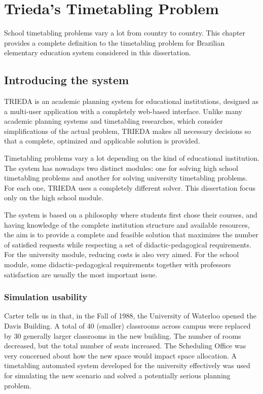 \chapter{Trieda's Timetabling Problem}
\label{chap:timetabling}


School timetabling problems vary a lot from country to country. This chapter provides a complete definition to the timetabling problem for Brazilian elementary education system considered in this dissertation.



\section{Introducing the system}
\label{sec:system}


TRIEDA is an academic planning system for educational institutions, designed as a multi-user application with a completely web-based interface. Unlike many academic planning systems and timetabling researches, which consider simplifications of the actual problem, TRIEDA makes all necessary decisions so that a complete, optimized and applicable solution is provided.

Timetabling problems vary a lot depending on the kind of educational institution. The system has nowadays two distinct modules: one for solving high school timetabling problems and another for solving university timetabling problems. For each one, TRIEDA uses a completely different solver. This dissertation focus only on the high school module.

The system is based on a  philosophy where students first chose their courses, and having knowledge of the complete institution structure and available resources, the aim is to provide a complete and feasible solution that maximizes the number of satisfied requests while respecting a set of didactic-pedagogical requirements. For the university module, reducing costs is also very aimed. For the school module, some didactic-pedagogical requirements together with professors satisfaction are usually the most important issue.


\subsection{Simulation usability}
\label{subsec:simulation}

Carter tells us in \cite{Carter2001} that, in the Fall of 1988, the University of Waterloo opened the Davis Building. A total of 40 (smaller) classrooms across campus were replaced by 30 generally larger classrooms in the new building. The number of rooms decreased, but the total number of seats increased. The Scheduling Office was very concerned about how the new space would impact space allocation. A timetabling automated system developed for the university effectively was used for simulating the new scenario and solved a potentially serious planning problem.

